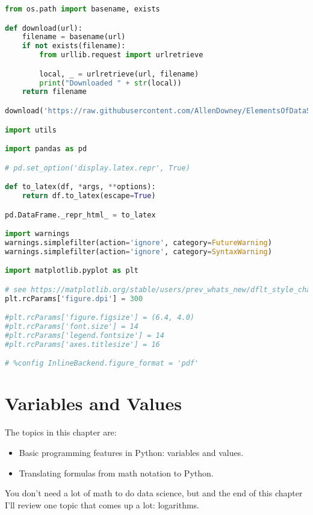 \documentclass[
]{book}
\author{}
\date{}
\begin{document}
\frontmatter

{
\setcounter{tocdepth}{2}
\tableofcontents
}
\mainmatter
\begin{lstlisting}[language=Python]
from os.path import basename, exists

def download(url):
    filename = basename(url)
    if not exists(filename):
        from urllib.request import urlretrieve

        local, _ = urlretrieve(url, filename)
        print("Downloaded " + str(local))
    return filename

download('https://raw.githubusercontent.com/AllenDowney/ElementsOfDataScience/v1/utils.py')

import utils

import pandas as pd

# pd.set_option('display.latex.repr', True)

def to_latex(df, *args, **options):
    return df.to_latex(escape=True)

pd.DataFrame._repr_html_ = to_latex

import warnings
warnings.simplefilter(action='ignore', category=FutureWarning)
warnings.simplefilter(action='ignore', category=SyntaxWarning)

import matplotlib.pyplot as plt

# see https://matplotlib.org/stable/users/prev_whats_new/dflt_style_changes.html#figure-size-font-size-and-screen-dpi
plt.rcParams['figure.dpi'] = 300

#plt.rcParams['figure.figsize'] = (6.4, 4.0)
#plt.rcParams['font.size'] = 14
#plt.rcParams['legend.fontsize'] = 14
#plt.rcParams['axes.titlesize'] = 16

# %config InlineBackend.figure_format = 'pdf'
\end{lstlisting}

\chapter{Variables and Values}\label{variables-and-values}

The topics in this chapter are:

\begin{itemize}
\item
  Basic programming features in Python: variables and values.
\item
  Translating formulas from math notation to Python.
\end{itemize}

You don't need a lot of math to do data science, but and the end of this
chapter I'll review one topic that comes up a lot: logarithms.
\end{document}
